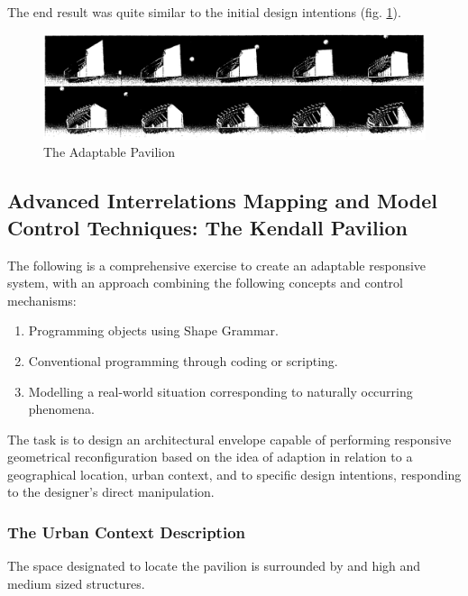 The end result was quite similar to the initial design intentions (fig. \ref{fig:FinalPav}).

\begin{figure}[htbp]
\centering
\includegraphics[width=\textwidth]{./Images/7-FinalPavilion}
\caption[Adaptable Pavilion Design Results]{The Adaptable Pavilion \cite{zulas04}}
\label{fig:FinalPav}
\end{figure}

\newpage
\subsection{Advanced Interrelations Mapping and Model Control Techniques: The Kendall Pavilion}
\label{sec:KendallPavilion}

The following is a comprehensive exercise to create an adaptable responsive system, with an approach combining the following concepts and control mechanisms:

\begin{enumerate}
\item Programming objects using Shape Grammar.
\item Conventional programming through coding or scripting.
\item Modelling a real-world situation corresponding to naturally occurring phenomena.
\end{enumerate}

The task is to design an architectural envelope capable of performing responsive geometrical reconfiguration based on the idea of adaption in relation to a geographical location, urban context, and to specific design intentions, responding to the designer's direct manipulation.

\subsubsection{The Urban Context Description}

The space designated to locate the pavilion is surrounded by and high and medium sized structures.

